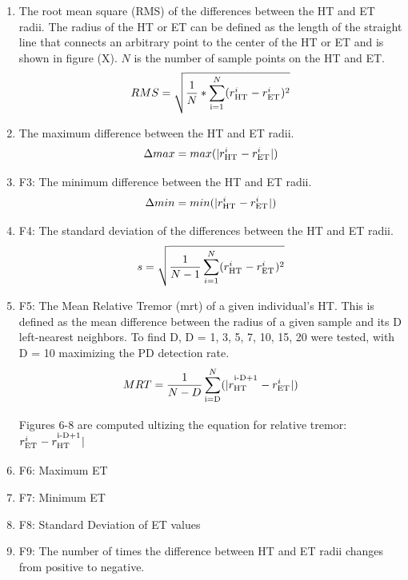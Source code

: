 \documentclass[pmlr,twocolumn,10pt]{jmlr} %
\let\SUP\textsuperscript
\begin{document}
\begin{enumerate}
\item The root mean square (RMS) of the differences between the HT and ET radii. The radius of the HT or ET can be defined as the length of the straight line that connects an arbitrary point to the center of the HT or ET and is shown in figure (X). $N$ is the number of sample points on the HT and ET.
\[RMS = \sqrt{\frac{1}{N} * \sum_\SUP{i=1}^N(r_\SUP{HT}^i - r_\SUP{ET}^i)^2}\]

\item The maximum difference between the HT and ET radii. 
\[\Delta max = max(|r_\SUP{HT}^i - r_\SUP{ET}^i|)\]

\item F3: The minimum difference between the HT and ET radii. 
\[\Delta min = min(|r_\SUP{HT}^i - r_\SUP{ET}^i|)\]

\item F4: The standard deviation of the differences between the HT and ET radii. 
\[s = \sqrt{\frac{1}{N-1}\sum_{i=1}^N(r_\SUP{HT}^i - r_\SUP{ET}^i)^2}\]

\item F5: The Mean Relative Tremor (mrt) of a given individual’s HT. This is defined as the mean difference between the radius of a given sample and its D left-nearest neighbors. To find D, D = {1, 3, 5, 7, 10, 15, 20} were tested, with D = 10 maximizing the PD detection rate. 
\[MRT = \frac{1}{N-D}\sum_\SUP{i=D}^N(|r_\SUP{HT}^\SUP{i-D+1} - r_\SUP{ET}^i|)\]

Figures 6-8 are computed ultizing the equation for relative tremor: $r_\SUP{ET}^i - r_\SUP{HT}^\SUP{i-D+1}|$
\item F6: Maximum ET
\item F7: Minimum ET
\item F8: Standard Deviation of ET values
\item F9: The number of times the difference between HT and ET radii changes from positive to negative.
\end{enumerate}
\end{document}
